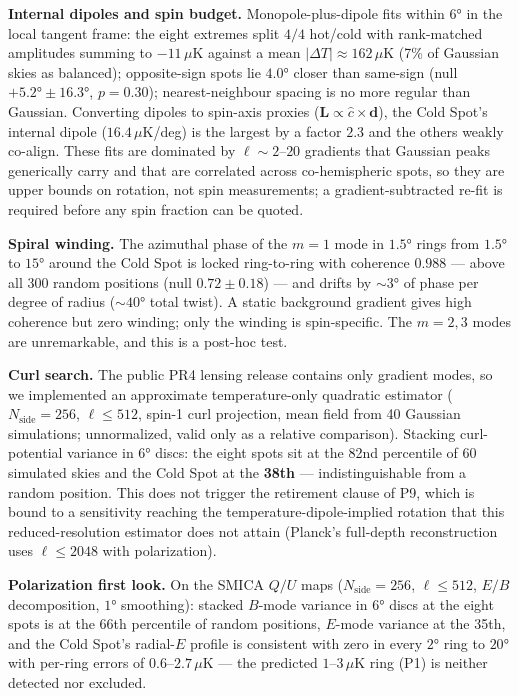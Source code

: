 \documentclass[
]{article}
\begin{document}
\textbf{Internal dipoles and spin budget.} Monopole-plus-dipole fits
within \(6°\) in the local tangent frame: the eight extremes split
\(4/4\) hot/cold with rank-matched amplitudes summing to \(-11\,\mu\)K
against a mean \(|\Delta T| \approx 162\,\mu\)K (7\% of Gaussian skies
as balanced); opposite-sign spots lie \(4.0°\) closer than same-sign
(null \(+5.2° \pm 16.3°\), \(p = 0.30\)); nearest-neighbour spacing is
no more regular than Gaussian. Converting dipoles to spin-axis proxies
(\(\mathbf{L} \propto \hat{c} \times \mathbf{d}\)), the Cold Spot's
internal dipole (\(16.4\,\mu\)K/deg) is the largest by a factor \(2.3\)
and the others weakly co-align. These fits are dominated by
\(\ell \sim 2\)--\(20\) gradients that Gaussian peaks generically carry
and that are correlated across co-hemispheric spots, so they are upper
bounds on rotation, not spin measurements; a gradient-subtracted re-fit
is required before any spin fraction can be quoted.

\textbf{Spiral winding.} The azimuthal phase of the \(m = 1\) mode in
\(1.5°\) rings from \(1.5°\) to \(15°\) around the Cold Spot is locked
ring-to-ring with coherence \(0.988\) --- above all 300 random positions
(null \(0.72 \pm 0.18\)) --- and drifts by \(\sim\!3°\) of phase per
degree of radius (\(\sim\!40°\) total twist). A static background
gradient gives high coherence but zero winding; only the winding is
spin-specific. The \(m = 2, 3\) modes are unremarkable, and this is a
post-hoc test.

\textbf{Curl search.} The public PR4 lensing release contains only
gradient modes, so we implemented an approximate temperature-only
quadratic estimator (\(N_{\text{side}} = 256\), \(\ell \leq 512\),
spin-1 curl projection, mean field from 40 Gaussian simulations;
unnormalized, valid only as a relative comparison). Stacking
curl-potential variance in \(6°\) discs: the eight spots sit at the 82nd
percentile of 60 simulated skies and the Cold Spot at the \textbf{38th}
--- indistinguishable from a random position. This does not trigger the
retirement clause of P9, which is bound to a sensitivity reaching the
temperature-dipole-implied rotation that this reduced-resolution
estimator does not attain (Planck's full-depth reconstruction uses
\(\ell \leq 2048\) with polarization).

\textbf{Polarization first look.} On the SMICA \(Q/U\) maps
(\(N_{\text{side}} = 256\), \(\ell \leq 512\), \(E/B\) decomposition,
\(1°\) smoothing): stacked \(B\)-mode variance in \(6°\) discs at the
eight spots is at the 66th percentile of random positions, \(E\)-mode
variance at the 35th, and the Cold Spot's radial-\(E\) profile is
consistent with zero in every \(2°\) ring to \(20°\) with per-ring
errors of \(0.6\)--\(2.7\,\mu\)K --- the predicted \(1\)--\(3\,\mu\)K
ring (P1) is neither detected nor excluded.
\end{document}
